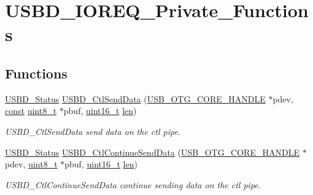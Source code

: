 \hypertarget{group___u_s_b_d___i_o_r_e_q___private___functions}{\section{U\-S\-B\-D\-\_\-\-I\-O\-R\-E\-Q\-\_\-\-Private\-\_\-\-Functions}
\label{group___u_s_b_d___i_o_r_e_q___private___functions}
}
\subsection*{Functions}
\begin{DoxyCompactItemize}
\item 
\hyperlink{group___u_s_b_d___c_o_r_e___exported___defines_ga1c59ec10075b576176aa51c9ef4e9fc4}{U\-S\-B\-D\-\_\-\-Status} \hyperlink{group___u_s_b_d___i_o_r_e_q___private___functions_gadfa5dad00860008104ec9a062a69f237}{U\-S\-B\-D\-\_\-\-Ctl\-Send\-Data} (\hyperlink{group___u_s_b___c_o_r_e___exported___types_gaf76054c11eb8a3367907aad7ae700e80}{U\-S\-B\-\_\-\-O\-T\-G\-\_\-\-C\-O\-R\-E\-\_\-\-H\-A\-N\-D\-L\-E} $\ast$pdev, \hyperlink{group___n_a_m_e_ga7ae6d0e43244213b34de2c2b9aa30da6}{const} \hyperlink{stdint_8h_aba7bc1797add20fe3efdf37ced1182c5}{uint8\-\_\-t} $\ast$pbuf, \hyperlink{stdint_8h_a273cf69d639a59973b6019625df33e30}{uint16\-\_\-t} \hyperlink{mavlink__helpers_8h_aba59486c1504340293255a065b546e3a}{len})
\begin{DoxyCompactList}\small\item\em U\-S\-B\-D\-\_\-\-Ctl\-Send\-Data send data on the ctl pipe. \end{DoxyCompactList}\item 
\hyperlink{group___u_s_b_d___c_o_r_e___exported___defines_ga1c59ec10075b576176aa51c9ef4e9fc4}{U\-S\-B\-D\-\_\-\-Status} \hyperlink{group___u_s_b_d___i_o_r_e_q___private___functions_ga1226d3f2d0340a5bec332764c13e6eb4}{U\-S\-B\-D\-\_\-\-Ctl\-Continue\-Send\-Data} (\hyperlink{group___u_s_b___c_o_r_e___exported___types_gaf76054c11eb8a3367907aad7ae700e80}{U\-S\-B\-\_\-\-O\-T\-G\-\_\-\-C\-O\-R\-E\-\_\-\-H\-A\-N\-D\-L\-E} $\ast$pdev, \hyperlink{stdint_8h_aba7bc1797add20fe3efdf37ced1182c5}{uint8\-\_\-t} $\ast$pbuf, \hyperlink{stdint_8h_a273cf69d639a59973b6019625df33e30}{uint16\-\_\-t} \hyperlink{mavlink__helpers_8h_aba59486c1504340293255a065b546e3a}{len})
\begin{DoxyCompactList}\small\item\em U\-S\-B\-D\-\_\-\-Ctl\-Continue\-Send\-Data continue sending data on the ctl pipe. \end{DoxyCompactList}\item 

\end{DoxyCompactItemize}
